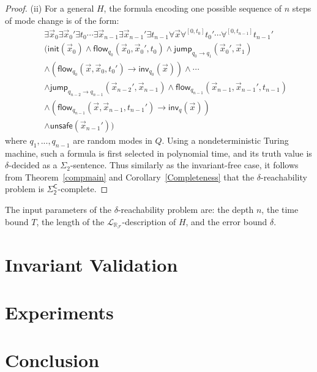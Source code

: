\documentclass[envcountsect]{llncs}
\newcommand{\flow}{\mathsf{flow}}
\newcommand{\jump}{\mathsf{jump}}
\newcommand{\inv}{\mathsf{inv}}
\newcommand{\init}{\mathsf{init}}
\newcommand{\unsafe}{\mathsf{unsafe}}
\newcommand{\lrf}{\mathcal{L}_{\mathbb{R}_{\mathcal{F}}}}
\begin{document}
\begin{proof}
(ii) For a general $H$, the formula encoding one possible sequence of $n$ steps of mode change is of the form:
\begin{eqnarray*}
& &\exists \vec x_0 \exists \vec x_0'\exists t_0\cdots \exists \vec x_{n-1}\exists\vec x_{n-1}'\exists t_{n-1} \forall \vec x \forall^{[0,t_0]}t_0'\cdots \forall^{[0,t_{n-1}]}t_{n-1}'\\
& &\Big(\init(\vec x_0)\wedge \flow_{q_0}(\vec x_0, \vec x_0', t_0)\wedge \jump_{q_0\rightarrow q_1}(\vec x_0', \vec x_1)\\
& &\wedge (\flow_{q_0}(\vec x, \vec x_0, t_0')\rightarrow \inv_{q_0}(\vec x))\wedge \cdots\\
& &\wedge\jump_{q_{n-2}\rightarrow q_{n-1}}(\vec x_{n-2}', \vec x_{n-1}) \wedge \flow_{q_{n-1}}(\vec x_{n-1}, \vec x_{n-1}', t_{n-1})\\
& &\wedge (\flow_{q_{n-1}}(\vec x, \vec x_{n-1}, t_{n-1}')\rightarrow \inv_q(\vec x))\\
& &\wedge \unsafe(\vec x_{n-1}')\Big)
\end{eqnarray*}
where $q_1,...,q_{n-1}$ are random modes in $Q$. Using a nondeterministic Turing machine, such a formula is first selected in polynomial time, and its truth value is $\delta$-decided as a $\Sigma_2$-sentence. Thus similarly as the invariant-free case, it follows from Theorem~\ref{compmain} and Corollary~\ref{Completeness} that the $\delta$-reachability problem is $\mathsf{\Sigma_2^C}$-complete. 

\end{proof}

\begin{remark}
The input parameters of the $\delta$-reachability problem are: the depth $n$, the time bound $T$, the length of the $\lrf$-description of $H$, and the error bound $\delta$. 
\end{remark}





\section{Invariant Validation}

\section{Experiments}

\section{Conclusion}
\end{document}
